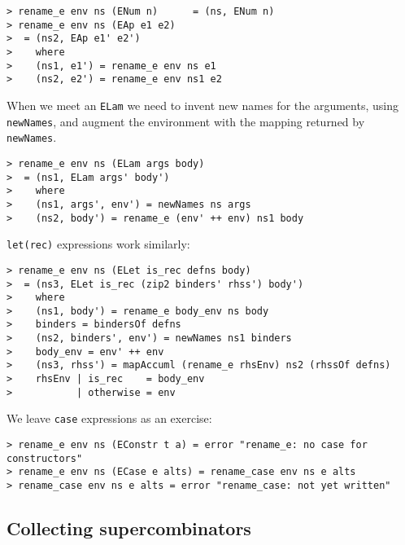 \begin{verbatim}
> rename_e env ns (ENum n)      = (ns, ENum n)
> rename_e env ns (EAp e1 e2)
>  = (ns2, EAp e1' e2')
>    where
>    (ns1, e1') = rename_e env ns e1
>    (ns2, e2') = rename_e env ns1 e2
\end{verbatim}
When we meet an \mbox{\tt ELam} we need to invent new names for the arguments,
using \mbox{\tt newNames}, and augment the environment with the mapping
returned by \mbox{\tt newNames}.
\begin{verbatim}
> rename_e env ns (ELam args body)
>  = (ns1, ELam args' body')
>    where
>    (ns1, args', env') = newNames ns args
>    (ns2, body') = rename_e (env' ++ env) ns1 body
\end{verbatim}
\mbox{\tt let(rec)} expressions work similarly:
\begin{verbatim}
> rename_e env ns (ELet is_rec defns body)
>  = (ns3, ELet is_rec (zip2 binders' rhss') body')
>    where
>    (ns1, body') = rename_e body_env ns body
>    binders = bindersOf defns
>    (ns2, binders', env') = newNames ns1 binders
>    body_env = env' ++ env
>    (ns3, rhss') = mapAccuml (rename_e rhsEnv) ns2 (rhssOf defns)
>    rhsEnv | is_rec    = body_env
>           | otherwise = env
\end{verbatim}
\par
We leave \mbox{\tt case} expressions as an exercise:
\begin{verbatim}
> rename_e env ns (EConstr t a) = error "rename_e: no case for constructors"
> rename_e env ns (ECase e alts) = rename_case env ns e alts
> rename_case env ns e alts = error "rename_case: not yet written"
\end{verbatim}
\subsection{Collecting supercombinators}

